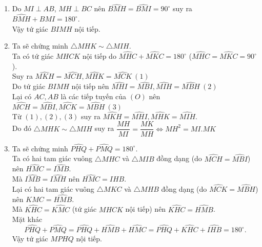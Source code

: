 \begin{ex}
{\begin{center}
{		}\end{center}
	\begin{enumerate}
		\item Do $MI \perp AB$,  $MH \perp BC$ nên $\widehat{BMH}=\widehat{BMI}=90^{\circ}$ suy ra $\widehat{BMH}+\widehat{BMI}=180^{\circ}$.
		\\ Vậy tứ giác $BIMH$ nội tiếp.
		\item Ta sẽ chứng minh $ \triangle MHK \sim \triangle MIH $.
		\\ Ta có tứ giác $MHCK$ nội tiếp do $\widehat{MHC}+\widehat{MKC}=180^{\circ}$ ($\widehat{MHC}=\widehat{MKC}=90^{\circ}$).
		\\ Suy ra $\widehat{MKH}=\widehat{MCH}, \widehat{MHK}=\widehat{MCK}\ (1)$\\
		Do tứ giác $BIMH$ nội tiếp nên $\widehat{MHI}=\widehat{MBI}, \widehat{MIH}=\widehat{MBH}\ (2)$\\
		Lại có $AC,AB$ là các tiếp tuyến của $(O)$ nên $\widehat{MCH}=\widehat{MBI}, \widehat{MCK}=\widehat{MBH}\ (3)$\\
		Từ $(1), (2), (3)$ suy ra $\widehat{MKH}=\widehat{MHI}, \widehat{MHK}=\widehat{MIH}.$\\
		Do đó $ \triangle MHK \sim \triangle MIH $ suy ra $\dfrac{MH}{MI}=\dfrac{MK}{MH}\Leftrightarrow MH^2 = MI.MK$
		\item Ta sẽ chứng minh $\widehat{PHQ}+\widehat{PMQ}=180^{\circ}$. 
		\\ Ta có hai tam giác vuông $\triangle MHC$ và $\triangle MIB$ đồng dạng (do $\widehat{MCH}=\widehat{MBI}$) nên $\widehat{HMC}=\widehat{IMB}$.
		\\ Mà $\widehat{IMB}=\widehat{IMH}$ nên $\widehat{HMC}=\widehat{IHB}$.
		\\ Lại có hai tam giác vuông $\triangle MKC$ và $\triangle MHB$ đồng dạng (do $\widehat{MCK}=\widehat{MBH}$) nên $\widehat{KMC}=\widehat{HMB}$.
		\\ Mà $\widehat{KHC}=\widehat{KMC}$ (tứ giác $MHCK$ nội tiếp) nên $\widehat{KHC}=\widehat{HMB}$.
		\\ Mặt khác $$\widehat{PHQ}+\widehat{PMQ}=\widehat{PHQ}+\widehat{HMB}+\widehat{HMC}=\widehat{PHQ}+\widehat{KHC}+\widehat{IHB}=180^{\circ}.$$
		Vậy tứ giác $MPHQ$ nội tiếp.
			\end{enumerate}
	}
\end{ex}
